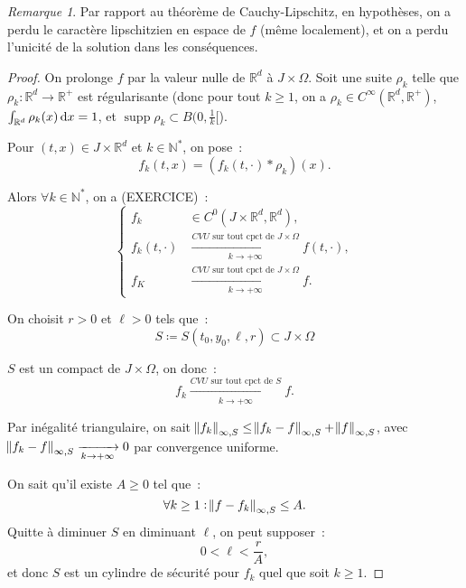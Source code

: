 \documentclass{report}
\theoremstyle{definition}
\theoremstyle{remark}
\newtheorem*{rmq}{Remarque}
\numberwithin{equation}{section}
\newcommand{\R}{\mathbb R}
\newcommand{\N}{\mathbb N}
\newcommand{\Ns}{\N^{*}}
\DeclareMathOperator{\supp}{supp}
\newcommand{\CONV}[5]{\xrightarrow[#2 \to #3]{#4 \text{ #5 } #1}}
\newcommand{\CVUc}[3]{\CONV{#1}{#2}{#3}{CVU}{sur tout cpct de}}
\newcommand{\pinfty}{{+\infty}}
\begin{document}
		\begin{rmq}Par rapport au théorème de Cauchy-Lipschitz, en hypothèses, on a perdu le caractère lipschitzien en espace de $f$ (même localement), et on
		a perdu l'unicité de la solution dans les conséquences.
		\end{rmq}

		\begin{proof} On prolonge $f$ par la valeur nulle de $\R^d$ à $J \times \Omega$. Soit une suite $\rho_k$ telle que $\rho_k : \R^d \to \R^+$ est
		régularisante (donc pour tout $k \geq 1$, on a $\rho_k \in C^\infty(\R^d, \R^+)$, $\int_{\R^d}\rho_k(x)\dif x = 1$, et $\supp \rho_k \subset B(0, \frac 1k[$).

		Pour $(t, x) \in J \times \R^d$ et $k \in \Ns$, on pose~:
		\begin{equation}
			f_k(t, x) = \left(f_k(t, \cdot) * \rho_k\right)(x).
		\end{equation}

		Alors $\forall k \in \Ns$, on a (EXERCICE)~:
		\begin{equation}
			\begin{cases}
			f_k &\in C^0(J \times \R^d, \R^d), \\
			f_k(t, \cdot) &\CVUc {J \times \Omega}k\pinfty f(t, \cdot), \\
			f_K &\CVUc {J \times \Omega}k\pinfty f.
		\end{cases}
		\end{equation}

		On choisit $r > 0$ et $\ell > 0$ tels que~:
		\begin{equation}
			S \coloneqq S(t_0, y_0, \ell, r) \subset J \times \Omega
		\end{equation}

		$S$ est un compact de $J \times \Omega$, on donc~:
		\begin{equation}
			f_k \CVUc Sk\pinfty f.
		\end{equation}

		Par inégalité triangulaire, on sait $\norm {f_k}_{\infty, S} \leq \norm {f_k - f}_{\infty, S} + \norm f_{\infty, S}$, avec
		$\norm {f_k - f}_{\infty, S} \xrightarrow[k \to \pinfty]{} 0$ par convergence uniforme.

		On sait qu'il existe $A \geq 0$ tel que~:
		\begin{equation}
			\forall k \geq 1 : \norm {f-f_k}_{\infty, S} \leq A.
		\end{equation}
		Quitte à diminuer $S$ en diminuant $\ell$, on peut supposer~:
		\begin{equation}
			0 < \ell < \frac rA,
		\end{equation}
		et donc $S$ est un cylindre de sécurité pour $f_k$ quel que soit $k \geq 1$.


\end{proof}
\end{document}
